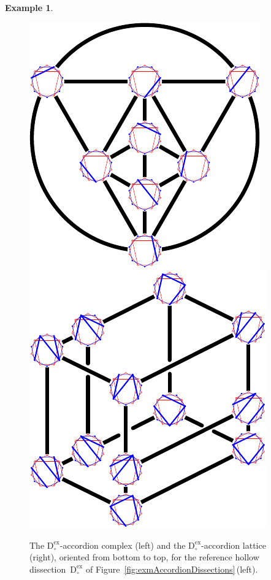 \documentclass{amsart}
\theoremstyle{definition}
\newtheorem{example}[theorem]{Example}
\newcommand{\fref}[1]{Figure~\ref{#1}} %
\newcommand{\dissection}{\mathrm{D}} %
\newcommand{\ex}{\mathrm{ex}} %
\begin{document}
\begin{example}
\begin{figure}
	\capstart
	\centerline{\includegraphics[scale=1]{exmAccordionComplex} \qquad \includegraphics[scale=1]{exmAccordionLattice}}
	\caption{The $\dissection_\circ^\ex$-accordion complex (left) and the $\dissection_\circ^\ex$-accordion lattice (right), oriented from bottom to top, for the reference hollow dissection~$\dissection_\circ^\ex$ of \fref{fig:exmAccordionDissections}\,(left).}
	\label{fig:exmAccordionComplex}
	\vspace*{-.1cm}
\end{figure}
\end{example}
\end{document}
